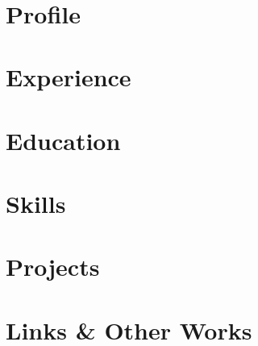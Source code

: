 \documentclass[11pt]{article}
\begin{document}
\begin{center}
  \begin{minipage}{0.5\textwidth}
    {\Huge\bfseries \cvname}\vspace{1ex} \\
    {\large \cvjobtitle}
  \end{minipage} \hfill
  \begin{minipage}{0.42\textwidth}
    
  \end{minipage}
\end{center}

\section{Profile}


\section{Experience}


\section{Education}


\section{Skills}


\section{Projects}


\section{Links \& Other Works}

\end{document}
